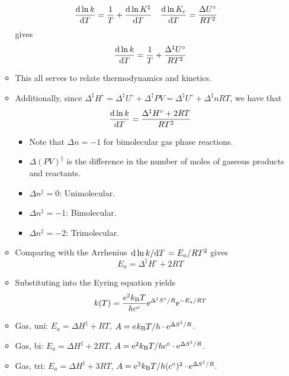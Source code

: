 \documentclass[../notes.tex]{subfiles}
\begin{document}
\begin{itemize}
\begin{itemize}
        \begin{align*}
            \dv{\ln k}{T} &= \frac{1}{T}+\dv{\ln K^\ddagger}{T}&
            \dv{\ln K_c}{T} &= \frac{\Delta U^\circ}{RT^2}
        \end{align*}
        gives
        \begin{equation*}
            \dv{\ln k}{T} = \frac{1}{T}+\frac{\Delta^\ddagger U^\circ}{RT^2}
        \end{equation*}
        \item This all serves to relate thermodynamics and kinetics.
        \item Additionally, since $\Delta^\ddagger H^\circ=\Delta^\ddagger U^\circ+\Delta^\ddagger PV=\Delta^\ddagger U^\circ+\Delta^\ddagger nRT$, we have that
        \begin{equation*}
            \dv{\ln k}{T} = \frac{\Delta^\ddagger H^\circ+2RT}{RT^2}
        \end{equation*}
        \begin{itemize}
            \item Note that $\Delta n=-1$ for bimolecular gas phase reactions.
            \item $\Delta(PV)^\ddagger$ is the difference in the number of moles of gaseous products and reactants.
            \item $\Delta n^\ddagger=0$: Unimolecular.
            \item $\Delta n^\ddagger=-1$: Bimolecular.
            \item $\Delta n^\ddagger=-2$: Trimolecular.
        \end{itemize}
        \item Comparing with the Arrhenius $\dv*{\ln k}{T}=E_a/RT^2$ gives
        \begin{equation*}
            E_a = \Delta^\ddagger H^\circ+2RT
        \end{equation*}
        \item Substituting into the Eyring equation yields
        \begin{equation*}
            k(T) = \frac{\e[2]\kB T}{hc^\circ}\e[\Delta^\ddagger S^\circ/R]\e[-E_a/RT]
        \end{equation*}
        \item Gas, uni: $E_a=\Delta H^\ddagger+RT$, $A=\e\kB T/h\cdot\e[\Delta S^\ddagger/R]$.
        \item Gas, bi: $E_a=\Delta H^\ddagger+2RT$, $A=\e[2]\kB T/hc^\circ\cdot\e[\Delta S^\ddagger/R]$.
        \item Gas, tri: $E_a=\Delta H^\ddagger+3RT$, $A=\e[3]\kB T/h(c^\circ)^2\cdot\e[\Delta S^\ddagger/R]$.

\end{itemize}
\end{itemize}
\end{document}
